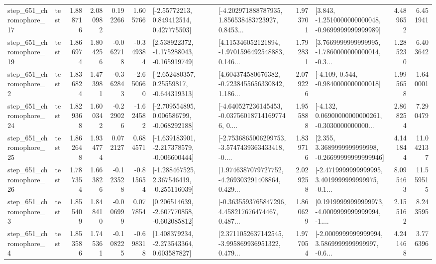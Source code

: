 \begin{tabular}{llrrrrllrlrr}
  step\_651\_chromophore\_17 &      test &      1.888716 &    2.080982 &      0.192266 &  1.605766 &     [-2.55772213, 0.849412514, 0.427775503] &  [-4.202971888787935, 1.856538483723927, 0.8453... &       1.973701 &  [3.843, -1.2510000000000048, -0.9699999999999989] &            4.489652 &          6.451941 \\
  step\_651\_chromophore\_19 &      test &      1.866974 &    1.804256 &     -0.062718 & -0.349384 &   [2.538922372, -1.175288043, -0.165919749] &  [4.115346052121894, -1.9701596492548883, 0.146... &       1.792831 &  [3.7669999999999995, -1.7860000000000014, -0.3... &            1.285230 &          6.403642 \\
   step\_651\_chromophore\_2 &      test &      1.836824 &    1.473981 &     -0.362843 & -2.650660 &    [-2.652480357, 0.25559817, -0.644319313] &  [4.604374580676382, -0.7238455656330842, 1.186... &       2.079226 &               [-4.109, 0.544, -0.9840000000000018] &            1.995658 &          1.640001 \\
  step\_651\_chromophore\_24 &      test &      1.829368 &    1.600342 &     -0.229026 & -1.624582 &   [-2.709554895, 0.006586799, -0.068292188] &  [-4.640527236145453, -0.037560187141697746, 0.... &       1.955888 &  [-4.132, 0.06900000000000261, -0.3030000000000... &            2.868254 &          7.290479 \\
  step\_651\_chromophore\_25 &      test &      1.862648 &    1.934774 &      0.072127 &  0.684571 &  [-1.639183901, -2.217378579, -0.006600444] &  [-2.7536865006299753, -3.5747439363433418, -0.... &       1.839716 &  [2.355, 3.3689999999999998, -0.26699999999999946] &            4.141844 &         11.042137 \\
  step\_651\_chromophore\_26 &      test &      1.787354 &    1.663826 &     -0.123528 & -0.815654 &   [-1.288467525, 2.367546419, -0.255116039] &  [1.9746387079727752, -4.269303291408864, 0.429... &       2.029258 &  [-2.4719999999999995, 3.4019999999999975, -0.1... &            8.095463 &         11.559515 \\
   step\_651\_chromophore\_3 &      test &      1.855409 &    1.848410 &     -0.006999 &  0.077854 &   [0.206514639, -2.607770858, -0.602085812] &  [-0.3635593765847296, 4.458217676474467, 0.487... &       1.860629 &  [0.19199999999999973, -4.0009999999999994, -1.... &            2.155162 &          8.243595 \\
   step\_651\_chromophore\_4 &      test &      1.853586 &    1.745361 &     -0.108225 & -0.698318 &    [1.408379234, -2.273543364, 0.603587827] &  [2.3711052637142545, -3.995869936951322, 0.479... &       1.977054 &  [-2.0009999999999994, 3.5869999999999997, -0.6... &            4.241468 &          3.776396 \\

\end{tabular}
